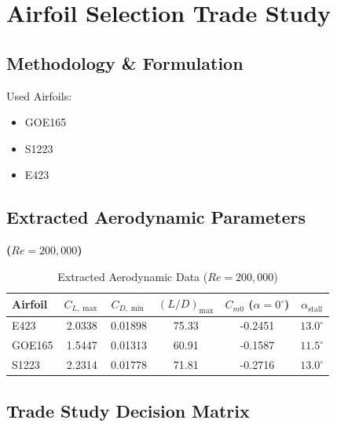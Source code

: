 \documentclass[11pt,a4paper]{article}
\begin{document}
\section{Airfoil Selection Trade Study}

\subsection{Methodology \& Formulation}
Used Airfoils: 
\begin{itemize}
    \item GOE165
    \item S1223
    \item E423
\end{itemize}


\subsection{Extracted Aerodynamic Parameters}
\textbf{ ($Re = 200,000$) }


\begin{table}[H]
\centering
\caption{Extracted Aerodynamic Data ($Re = 200,000$)}
\label{tab:airfoil_extracted_data}
\begin{tabular}{lccccc}
\toprule
\textbf{Airfoil} & \textbf{$C_{L,\max}$} & \textbf{$C_{D,\min}$} & \textbf{$(L/D)_{\max}$} & \textbf{$C_{m0}$ ($\alpha=0^\circ$)} & \textbf{$\alpha_{\text{stall}}$} \\
\midrule
E423   & 2.0338 & 0.01898 & 75.33 & -0.2451 & $13.0^\circ$ \\
GOE165 & 1.5447 & 0.01313 & 60.91 & -0.1587 & $11.5^\circ$ \\
S1223  & 2.2314 & 0.01778 & 71.81 & -0.2716 & $13.0^\circ$ \\
\bottomrule
\end{tabular}
\end{table}


\subsection{Trade Study Decision Matrix}
\end{document}
